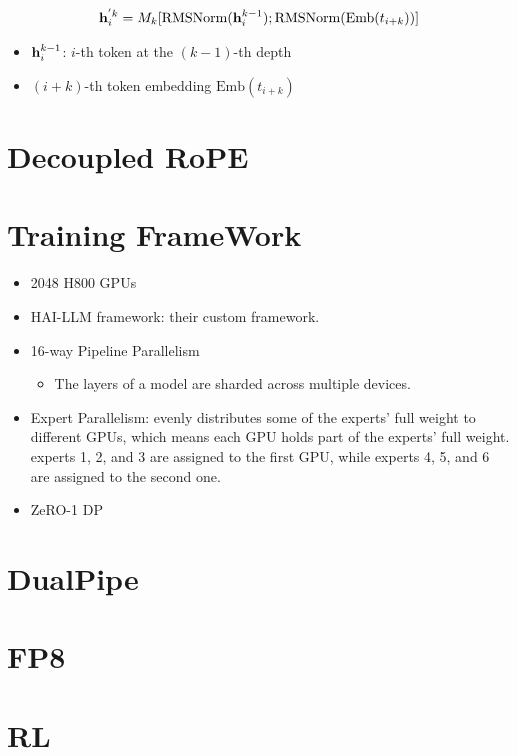 \begin{align*}
	{\mathbf{h}}_i^{'k} = M_k[\text{RMSNorm}({\mathbf{h}}_i^{k-1}); \text{RMSNorm}(\text{Emb}(t_{i+k}))]
\end{align*}
\begin{itemize}
	\item ${\mathbf{h}}_i^{k-1}$: $i$-th token at the $(k-1)$-th depth 
	\item $(i+k)$-th token embedding $\text{Emb}(t_{i+k})$
\end{itemize}

\section{Decoupled RoPE}
\section{Training FrameWork}
\begin{itemize}
	\item 2048 H800 GPUs
	\item HAI-LLM framework: their custom framework. 
	\item 16-way Pipeline Parallelism
		\begin{itemize}
			\item The layers of a model are sharded across multiple devices. 
		\end{itemize}
	\item Expert Parallelism: evenly distributes some of the experts' full weight to different GPUs, which means each GPU holds part of the experts' full weight. \eg experts 1, 2, and 3 are assigned to the first GPU, while experts 4, 5, and 6 are assigned to the second one.
	\item ZeRO-1 DP
\end{itemize}
\section{DualPipe}
\section{FP8}
\section{RL}





